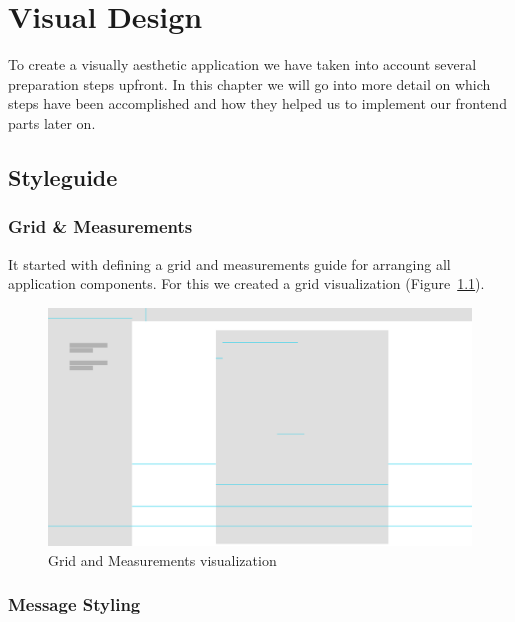 \chapter{Visual Design}\label{ch:visual-design}

To create a visually aesthetic application we have taken into account several preparation steps upfront. In this chapter
we will go into more detail on which steps have been accomplished and how they helped us to implement our frontend parts
later on.

\section{Styleguide}\label{sec:styleguide}

\subsection{Grid \& Measurements}\label{subsec:grid-and-measurements}

It started with defining a grid and measurements guide for arranging all application components. For this we created a
grid visualization (Figure~\ref{fig:grid}).

\begin{figure}[!ht]
    \centering
    \includegraphics[width=1.0\textwidth]{./images/grid.pdf}
    \caption{Grid and Measurements visualization}
    \label{fig:grid}
\end{figure}

\subsection{Message Styling}\label{subsec:message-styling}

